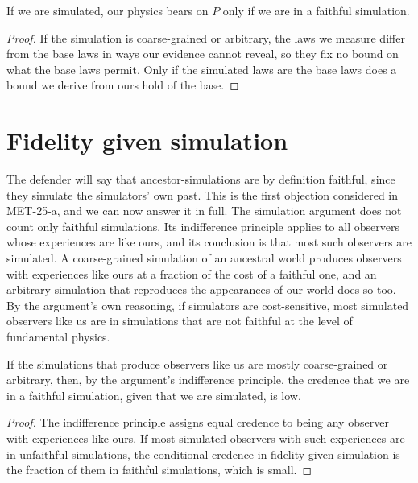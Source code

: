 \documentclass{situationist-preprint}
\begin{document}
\begin{proposition}\label{p:fid}
If we are simulated, our physics bears on $P$ only if we are in a faithful simulation.
\end{proposition}

\begin{proof}
If the simulation is coarse-grained or arbitrary, the laws we measure differ from the base laws in ways our evidence cannot reveal, so they fix no bound on what the base laws permit. Only if the simulated laws are the base laws does a bound we derive from ours hold of the base.
\end{proof}

\section{Fidelity given simulation}

The defender will say that ancestor-simulations are by definition faithful, since they simulate the simulators' own past. This is the first objection considered in MET-25-a, and we can now answer it in full. The simulation argument does not count only faithful simulations. Its indifference principle applies to all observers whose experiences are like ours, and its conclusion is that most such observers are simulated. A coarse-grained simulation of an ancestral world produces observers with experiences like ours at a fraction of the cost of a faithful one, and an arbitrary simulation that reproduces the appearances of our world does so too. By the argument's own reasoning, if simulators are cost-sensitive, most simulated observers like us are in simulations that are not faithful at the level of fundamental physics.

\begin{proposition}\label{p:improb}
If the simulations that produce observers like us are mostly coarse-grained or arbitrary, then, by the argument's indifference principle, the credence that we are in a faithful simulation, given that we are simulated, is low.
\end{proposition}

\begin{proof}
The indifference principle assigns equal credence to being any observer with experiences like ours. If most simulated observers with such experiences are in unfaithful simulations, the conditional credence in fidelity given simulation is the fraction of them in faithful simulations, which is small.
\end{proof}
\end{document}
